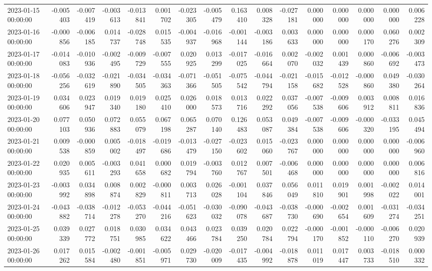 \begin{tabular}{lrrrrrrrrrrrrrrr}
2023-01-15 00:00:00 & -0.005403 & -0.007419 & -0.003613 & -0.013841 & 0.001702 & -0.023305 & -0.005479 & 0.163410 & 0.008328 & -0.027181 & 0.000000 & 0.000000 & 0.000000 & 0.000000 & 0.006228 \\
2023-01-16 00:00:00 & -0.000856 & -0.006185 & 0.014737 & -0.028748 & 0.015535 & -0.004937 & -0.016968 & -0.001144 & -0.003186 & 0.003633 & 0.000000 & 0.000000 & 0.000170 & 0.060276 & 0.002309 \\
2023-01-17 00:00:00 & -0.014083 & -0.010936 & -0.002495 & -0.009729 & -0.007555 & 0.020925 & 0.013299 & -0.017025 & -0.016664 & 0.002070 & -0.002032 & 0.001439 & 0.000860 & -0.006692 & -0.003473 \\
2023-01-18 00:00:00 & -0.056256 & -0.032619 & -0.021890 & -0.034505 & -0.034363 & -0.071366 & -0.051505 & -0.075542 & -0.044794 & -0.021158 & -0.015682 & -0.012528 & -0.000860 & 0.049380 & -0.030264 \\
2023-01-19 00:00:00 & 0.034606 & 0.023947 & 0.019340 & 0.019180 & 0.025410 & 0.026000 & 0.018573 & 0.013716 & 0.022292 & 0.037056 & -0.007538 & -0.009606 & 0.003912 & 0.008811 & 0.016836 \\
2023-01-20 00:00:00 & 0.077103 & 0.050936 & 0.072883 & 0.055079 & 0.067198 & 0.065287 & 0.070140 & 0.126483 & 0.053087 & 0.049384 & -0.007538 & -0.009606 & -0.000320 & -0.033195 & 0.045494 \\
2023-01-21 00:00:00 & 0.009538 & -0.000859 & 0.005002 & -0.018497 & -0.019686 & -0.013479 & -0.027150 & -0.023602 & 0.015060 & -0.023767 & 0.000000 & 0.000000 & 0.000000 & 0.000000 & -0.006960 \\
2023-01-22 00:00:00 & 0.020935 & 0.005611 & -0.003293 & 0.041658 & 0.000682 & 0.019794 & -0.003760 & 0.012767 & 0.007501 & -0.006468 & 0.000000 & 0.000000 & 0.000000 & 0.000000 & 0.006816 \\
2023-01-23 00:00:00 & -0.003992 & 0.034898 & 0.008874 & 0.002829 & -0.000811 & 0.003713 & 0.026028 & -0.001104 & 0.037846 & 0.056049 & 0.011810 & 0.019901 & 0.001998 & -0.002022 & 0.014001 \\
2023-01-24 00:00:00 & -0.043882 & -0.038714 & -0.012278 & -0.053270 & -0.044216 & -0.051623 & -0.030032 & -0.090078 & -0.043687 & -0.038730 & -0.000690 & -0.002654 & 0.001609 & -0.031274 & -0.034251 \\
2023-01-25 00:00:00 & 0.039339 & 0.027772 & 0.018751 & 0.030985 & 0.034622 & 0.043466 & 0.023784 & 0.039250 & 0.020784 & 0.022794 & -0.000170 & -0.001852 & -0.000110 & -0.006270 & 0.020939 \\
2023-01-26 00:00:00 & 0.017262 & 0.015584 & -0.002480 & -0.001851 & -0.005971 & 0.029730 & -0.020009 & -0.017435 & -0.004992 & -0.018878 & 0.011019 & 0.017447 & 0.003733 & -0.018510 & 0.000332 \\

\end{tabular}
